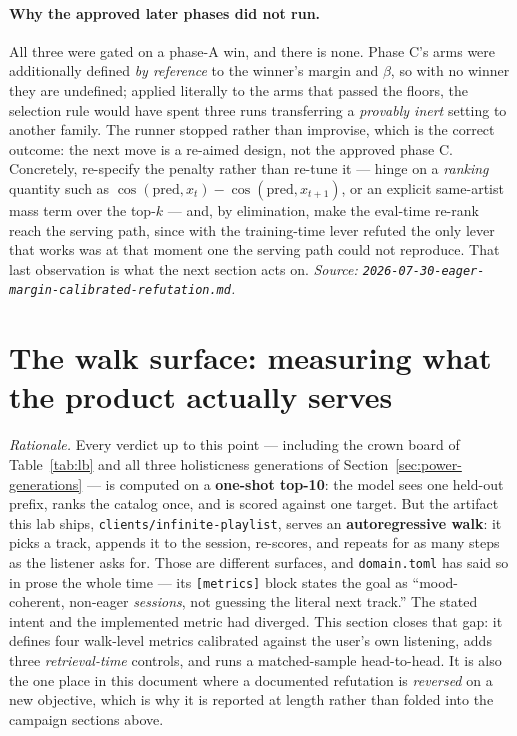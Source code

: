 \documentclass[11pt]{article}
\begin{document}
\paragraph{Why the approved later phases did not run.} All three were gated on a
phase-A win, and there is none. Phase C's arms were additionally defined \emph{by
reference} to the winner's margin and $\beta$, so with no winner they are
undefined; applied literally to the arms that passed the floors, the selection rule
would have spent three runs transferring a \emph{provably inert} setting to another
family. The runner stopped rather than improvise, which is the correct outcome: the
next move is a re-aimed design, not the approved phase C. Concretely, re-specify
the penalty rather than re-tune it --- hinge on a \emph{ranking} quantity such as
$\cos(\mathrm{pred}, x_t) - \cos(\mathrm{pred}, x_{t+1})$, or an explicit
same-artist mass term over the top-$k$ --- and, by elimination, make the eval-time
re-rank reach the serving path, since with the training-time lever refuted the only
lever that works was at that moment one the serving path could not reproduce. That
last observation is what the next section acts on.
\emph{Source: \texttt{2026-07-30-eager-margin-calibrated-refutation.md}.}

\section{The walk surface: measuring what the product actually serves}
\label{sec:walk}
\emph{Rationale.} Every verdict up to this point --- including the crown board
of Table~\ref{tab:lb} and all three holisticness generations of
Section~\ref{sec:power-generations} --- is computed on a \textbf{one-shot
top-10}: the model sees one held-out prefix, ranks the catalog once, and is
scored against one target. But the artifact this lab ships,
\texttt{clients/infinite-playlist}, serves an \textbf{autoregressive walk}: it
picks a track, appends it to the session, re-scores, and repeats for as many
steps as the listener asks for. Those are different surfaces, and
\texttt{domain.toml} has said so in prose the whole time --- its
\texttt{[metrics]} block states the goal as ``mood-coherent, non-eager
\emph{sessions}, not guessing the literal next track.'' The stated intent and
the implemented metric had diverged. This section closes that gap: it defines
four walk-level metrics calibrated against the user's own listening, adds three
\emph{retrieval-time} controls, and runs a matched-sample head-to-head. It is
also the one place in this document where a documented refutation is
\emph{reversed} on a new objective, which is why it is reported at length rather
than folded into the campaign sections above.
\end{document}
